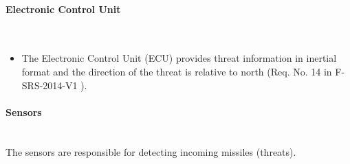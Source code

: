 \paragraph{Electronic Control Unit}\mbox{}\\
\begin{itemize}
\item The Electronic Control Unit (ECU) provides threat information in inertial format and the direction of the threat is relative to north (Req. No. 14 in F-SRS-2014-V1 ).
\end{itemize}

\paragraph{Sensors}\mbox{}\\
The sensors are responsible for detecting incoming missiles (threats).